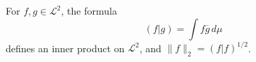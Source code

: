 For $f, g \in \mathcal{L}^2$, the formula
$$(f|g) = \int f\overline{g} \, d\mu$$
defines an inner product on $\mathcal{L}^2$, and $\|f\|_2 = (f|f)^{1/2}$.
